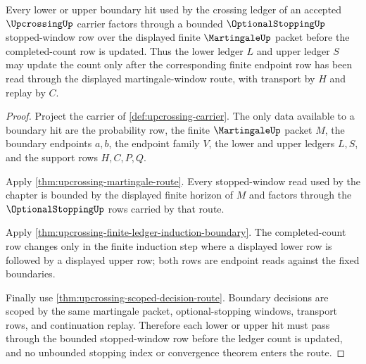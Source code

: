 \begin{theorem}
\label{thm:upcrossing-bounded-optional-stopping-route}
Every lower or upper boundary hit used by the crossing ledger of an accepted $\UpcrossingUp$ carrier factors through a bounded $\OptionalStoppingUp$ stopped-window row over the displayed finite $\MartingaleUp$ packet before the completed-count row is updated. Thus the lower ledger $L$ and upper ledger $S$ may update the count only after the corresponding finite endpoint row has been read through the displayed martingale-window route, with transport by $H$ and replay by $C$.
\end{theorem}
\begin{proof}
Project the carrier of \autoref{def:upcrossing-carrier}. The only data available to a boundary hit are the probability row, the finite $\MartingaleUp$ packet $M$, the boundary endpoints $a,b$, the endpoint family $V$, the lower and upper ledgers $L,S$, and the support rows $H,C,P,Q$.

Apply \autoref{thm:upcrossing-martingale-route}. Every stopped-window read used by the chapter is bounded by the displayed finite horizon of $M$ and factors through the $\OptionalStoppingUp$ rows carried by that route.

Apply \autoref{thm:upcrossing-finite-ledger-induction-boundary}. The completed-count row changes only in the finite induction step where a displayed lower row is followed by a displayed upper row; both rows are endpoint reads against the fixed boundaries.

Finally use \autoref{thm:upcrossing-scoped-decision-route}. Boundary decisions are scoped by the same martingale packet, optional-stopping windows, transport rows, and continuation replay. Therefore each lower or upper hit must pass through the bounded stopped-window row before the ledger count is updated, and no unbounded stopping index or convergence theorem enters the route.
\end{proof}

